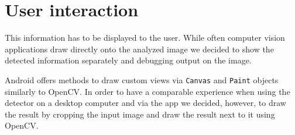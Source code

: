 	\section{User interaction}
	\label{android-ui}
	This information has to be displayed to the user. While often computer vision applications draw directly onto the analyzed image we decided to show the detected information separately and debugging output on the image.

	Android offers methods to draw custom views via \texttt{Canvas} and \texttt{Paint} objects similarly to OpenCV. In order to have a comparable experience when using the detector on a desktop computer and via the app we decided, however, to draw the result by cropping the input image and draw the result next to it using OpenCV.
